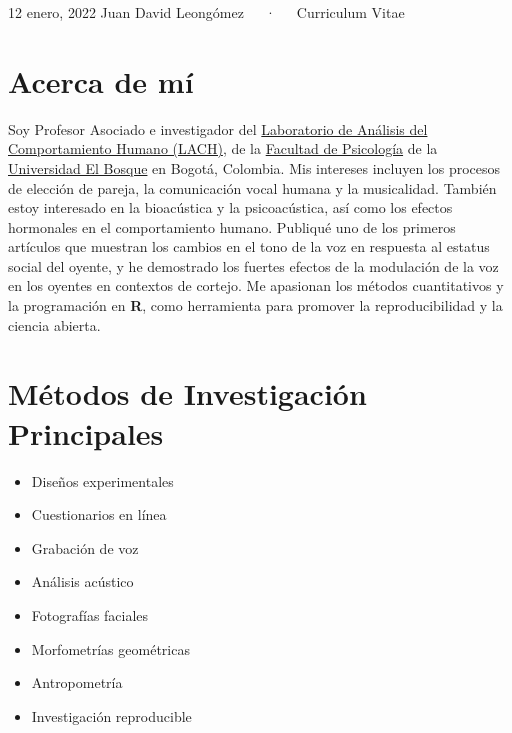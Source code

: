 \documentclass[11pt, a4paper]{awesome-cv}
\begin{document}
\makecvheader

\makecvfooter
  {12 enero, 2022}
    {Juan David Leongómez~~~·~~~Curriculum Vitae}
  {\thepage}





\hypertarget{acerca-de-muxed}{%
\section{Acerca de mí}\label{acerca-de-muxed}}

Soy Profesor Asociado e investigador del
\href{https://www.psicologia.unbosque.edu.co/lach}{Laboratorio de
Análisis del Comportamiento Humano (LACH)}, de la
\href{https://www.uelbosque.edu.co/psicologia}{Facultad de Psicología}
de la \href{https://www.uelbosque.edu.co/}{Universidad El Bosque} en
Bogotá, Colombia. Mis intereses incluyen los procesos de elección de
pareja, la comunicación vocal humana y la musicalidad. También estoy
interesado en la bioacústica y la psicoacústica, así como los efectos
hormonales en el comportamiento humano. Publiqué uno de los primeros
artículos que muestran los cambios en el tono de la voz en respuesta al
estatus social del oyente, y he demostrado los fuertes efectos de la
modulación de la voz en los oyentes en contextos de cortejo. Me
apasionan los métodos cuantitativos y la programación en \textbf{R},
como herramienta para promover la reproducibilidad y la ciencia abierta.

\hypertarget{muxe9todos-de-investigaciuxf3n-principales}{%
\section{Métodos de Investigación
Principales}\label{muxe9todos-de-investigaciuxf3n-principales}}

\begin{multicols}{2}
\begin{itemize}
 \item Diseños experimentales
 \item Cuestionarios en línea 
 \item Grabación de voz
 \item Análisis acústico
 \item Fotografías faciales
 \item Morfometrías geométricas
 \item Antropometría
 \item Investigación reproducible
\end{itemize}
\end{multicols}
\end{document}
